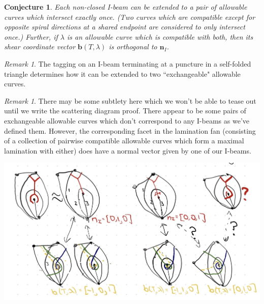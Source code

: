 \documentclass{amsart}
\newtheorem{conj}[proposition]{Conjecture}
\theoremstyle{definition}
\theoremstyle{remark}
\newtheorem{remark}[proposition]{Remark}
\numberwithin{equation}{section}
\newcommand{\0}{{\mathbf{0}}}
\begin{document}
\begin{conj}
Each non-closed I-beam can be extended to a pair of allowable curves which intersect exactly once. (Two curves which are compatible except for opposite spiral directions at a shared endpoint are considered to only intersect once.)
Further, if $\lambda$ is an allowable curve which is compatible with both, then its shear coordinate vector $\textbf{b}(T, \lambda)$ is orthogonal to $\mathbf{n}_I$.
\end{conj}

\begin{remark}
The tagging on an I-beam terminating at a puncture in a self-folded triangle determines how it can be extended to two ``exchangeable" allowable curves. 
\end{remark}

\begin{remark}
There may be some subtlety here which we won't be able to tease out until we write the scattering diagram proof. 
There appear to be some pairs of exchangeable allowable curves which don't correspond to any I-beams as we've defined them. However, the corresponding facet in the lamination fan (consisting of a collection of pairwise compatible allowable curves which form a maximal lamination with either) does have a normal vector given by one of our I-beams.

\includegraphics[scale=.2]{new_ibeam.jpg}
\end{remark}
\end{document}
